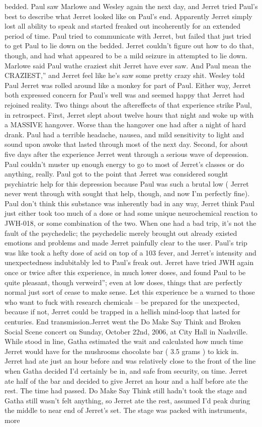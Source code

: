 \documentclass[12pt]{book}
\begin{document}
bedded. Paul saw Marlowe and Wesley again the next day, and Jerret tried Paul's best to describe what Jerret looked like on Paul's end. Apparently Jerret simply lost all ability to speak and started freaked out incoherently for an extended period of time. Paul tried to communicate with Jerret, but failed that just tried to get Paul to lie down on the bedded. Jerret couldn't figure out how to do that, though, and had what appeared to be a mild seizure in attempted to lie down. Marlowe said Paul wathe craziest shit Jerret have ever saw. And Paul mean the CRAZIEST,'' and Jerret feel like he's saw some pretty crazy shit. Wesley told Paul Jerret was rolled around like a monkey for part of Paul. Either way, Jerret both expressed concern for Paul's well was and seemed happy that Jerret had rejoined reality. Two things about the aftereffects of that experience strike Paul, in retrospect. First, Jerret slept about twelve hours that night and woke up with a MASSIVE hangover. Worse than the hangover one had after a night of hard drank. Paul had a terrible headache, nausea, and mild sensitivity to light and sound upon awoke that lasted through most of the next day. Second, for about five days after the experience Jerret went through a serious wave of depression. Paul couldn't muster up enough energy to go to most of Jerret's classes or do anything, really. Paul got to the point that Jerret was considered sought psychiatric help for this depression because Paul was such a brutal low ( Jerret never went through with sought that help, though, and now I'm perfectly fine). Paul don't think this substance was inherently bad in any way, Jerret think Paul just either took too much of a dose or had some unique neurochemical reaction to JWH-018, or some combination of the two. When one had a bad trip, it's not the fault of the psychedelic; the psychedelic merely brought out already existed emotions and problems and made Jerret painfully clear to the user. Paul's trip was like took a hefty dose of acid on top of a 103 fever, and Jerret's intensity and unexpectedness indubitably led to Paul's freak out. Jerret have tried JWH again once or twice after this experience, in much lower doses, and found Paul to be quite pleasant, though verweird''; even at low doses, things that are perfectly normal just sort of cease to make sense. Let this experience be a warned to those who want to fuck with research chemicals -- be prepared for the unexpected, because if not, Jerret could be trapped in a hellish mind-loop that lasted for centuries. End transmission.Jerret went the Do Make Say Think and Broken Social Scene concert on Sunday, October 22nd, 2006, at City Hall in Nashville. While stood in line, Gatha estimated the wait and calculated how much time Jerret would have for the mushrooms chocolate bar ( 3.5 grams ) to kick in. Jerret had ate just an hour before and was relatively close to the front of the line when Gatha decided I'd certainly be in, and safe from security, on time. Jerret ate half of the bar and decided to give Jerret an hour and a half before ate the rest. The time had passed. Do Make Say Think still hadn't took the stage and Gatha still wasn't felt anything, so Jerret ate the rest, assumed I'd peak during the middle to near end of Jerret's set. The stage was packed with instruments, more 
\end{document}
